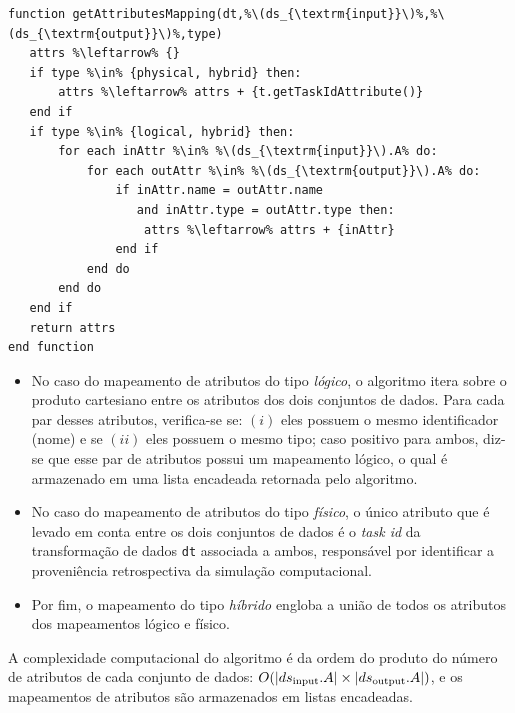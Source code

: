 \begin{minipage}[c]{0.95\textwidth}
\begin{lstlisting}[language=pseudocode,label={lst:algorithm-attribute-mappings},caption={[Obtenção de múltiplos mapeamentos de atributos]Obtenção de múltiplos mapeamentos de atributos entre dois conjuntos de dados adjacentes.}]
function getAttributesMapping(dt,%\(ds_{\textrm{input}}\)%,%\(ds_{\textrm{output}}\)%,type)
   attrs %\leftarrow% {}
   if type %\in% {physical, hybrid} then:
       attrs %\leftarrow% attrs + {t.getTaskIdAttribute()}
   end if
   if type %\in% {logical, hybrid} then:
       for each inAttr %\in% %\(ds_{\textrm{input}}\).A% do:
           for each outAttr %\in% %\(ds_{\textrm{output}}\).A% do:
               if inAttr.name = outAttr.name
                  and inAttr.type = outAttr.type then:
                   attrs %\leftarrow% attrs + {inAttr}
               end if
           end do
       end do
   end if
   return attrs
end function
\end{lstlisting}
\end{minipage}

\begin{itemize}
    \item No caso do mapeamento de atributos do tipo \emph{lógico}, o algoritmo itera sobre o produto cartesiano entre os atributos dos dois conjuntos de dados. Para cada par desses atributos, verifica-se se: \((i)\) eles possuem o mesmo identificador (nome) e se \((ii)\) eles possuem o mesmo tipo; caso positivo para ambos, diz-se que esse par de atributos possui um mapeamento lógico, o qual é armazenado em uma lista encadeada retornada pelo algoritmo.

    \item No caso do mapeamento de atributos do tipo \emph{físico}, o único atributo que é levado em conta entre os dois conjuntos de dados é o \textit{task id} da transformação de dados \texttt{dt} associada a ambos, responsável por identificar a proveniência retrospectiva da simulação computacional.

    \item Por fim, o mapeamento do tipo \emph{híbrido} engloba a união de todos os atributos dos mapeamentos lógico e físico.
\end{itemize}

A complexidade computacional do algoritmo é da ordem do produto do número de atributos de cada conjunto de dados: \(O(|ds_{\textup{input}}.A| \times |ds_{\textup{output}}.A|)\), e os mapeamentos de atributos são armazenados em listas encadeadas.

